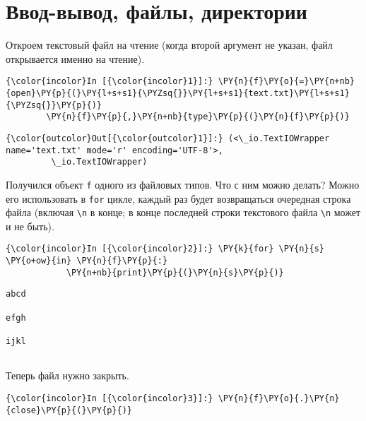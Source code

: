 \section{Ввод-вывод, файлы, директории}
\label{S112}

Откроем текстовый файл на чтение (когда второй аргумент не указан, файл
открывается именно на чтение).

    \begin{Verbatim}[commandchars=\\\{\}]
{\color{incolor}In [{\color{incolor}1}]:} \PY{n}{f}\PY{o}{=}\PY{n+nb}{open}\PY{p}{(}\PY{l+s+s1}{\PYZsq{}}\PY{l+s+s1}{text.txt}\PY{l+s+s1}{\PYZsq{}}\PY{p}{)}
        \PY{n}{f}\PY{p}{,}\PY{n+nb}{type}\PY{p}{(}\PY{n}{f}\PY{p}{)}
\end{Verbatim}

            \begin{Verbatim}[commandchars=\\\{\}]
{\color{outcolor}Out[{\color{outcolor}1}]:} (<\_io.TextIOWrapper name='text.txt' mode='r' encoding='UTF-8'>,
         \_io.TextIOWrapper)
\end{Verbatim}
        
    Получился объект \texttt{f} одного из файловых типов. Что с ним можно
делать? Можно его использовать в \texttt{for} цикле, каждый раз будет
возвращаться очередная строка файла (включая
\texttt{\textquotesingle{}\textbackslash{}n\textquotesingle{}} в конце;
в конце последней строки текстового файла
\texttt{\textquotesingle{}\textbackslash{}n\textquotesingle{}} может и
не быть).

    \begin{Verbatim}[commandchars=\\\{\}]
{\color{incolor}In [{\color{incolor}2}]:} \PY{k}{for} \PY{n}{s} \PY{o+ow}{in} \PY{n}{f}\PY{p}{:}
            \PY{n+nb}{print}\PY{p}{(}\PY{n}{s}\PY{p}{)}
\end{Verbatim}

    \begin{Verbatim}[commandchars=\\\{\}]
abcd

efgh

ijkl


    \end{Verbatim}

    Теперь файл нужно закрыть.

    \begin{Verbatim}[commandchars=\\\{\}]
{\color{incolor}In [{\color{incolor}3}]:} \PY{n}{f}\PY{o}{.}\PY{n}{close}\PY{p}{(}\PY{p}{)}
\end{Verbatim}

